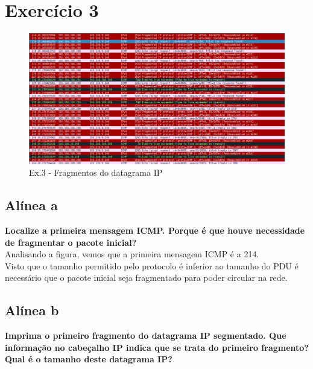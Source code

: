 \documentclass[a4paper]{report}
\begin{document}
\section{Exercício 3}

\begin{figure}[H]
    \centering 
    \includegraphics[width=\textwidth]{images/datagramaIpEx3.png}
    \caption{Ex.3 - Fragmentos do datagrama IP}
    \label{fig:datagramaIpEx3}
\end{figure}
\subsection{Alínea a}
\textbf{Localize a primeira mensagem ICMP. Porque é que houve necessidade de
fragmentar o pacote inicial?}\\
Analisando a figura, vemos que a primeira mensagem ICMP é a 214.\\
Visto que o tamanho permitido pelo protocolo é inferior ao tamanho do PDU é
necessário que o pacote inicial seja fragmentado para poder circular na rede.

\subsection{Alínea b}
\textbf{Imprima o primeiro fragmento do datagrama IP segmentado. Que informação
no cabeçalho IP indica que se trata do primeiro fragmento? Qual é o tamanho
deste datagrama IP?}
\end{document}
